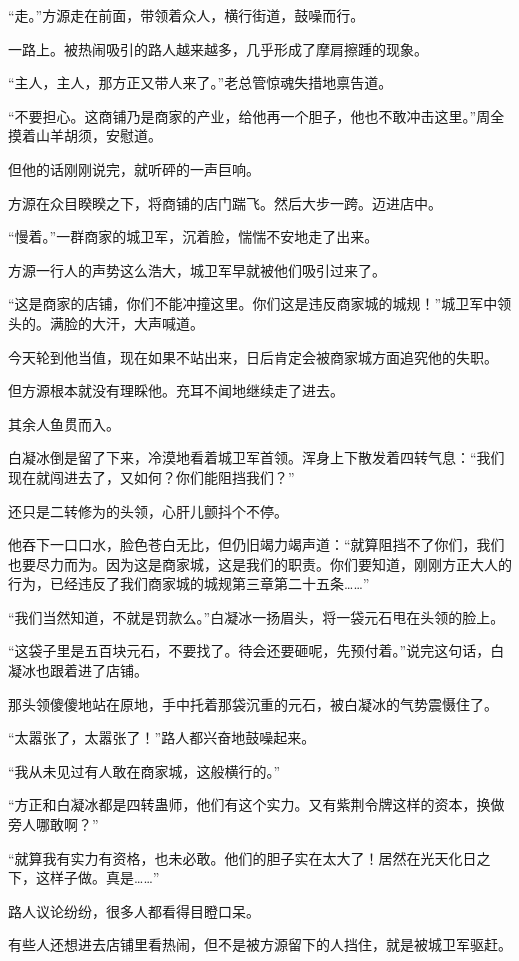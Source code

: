 \begin{this_body}
“走。”方源走在前面，带领着众人，横行街道，鼓噪而行。

一路上。被热闹吸引的路人越来越多，几乎形成了摩肩擦踵的现象。

“主人，主人，那方正又带人来了。”老总管惊魂失措地禀告道。

“不要担心。这商铺乃是商家的产业，给他再一个胆子，他也不敢冲击这里。”周全摸着山羊胡须，安慰道。

但他的话刚刚说完，就听砰的一声巨响。

方源在众目睽睽之下，将商铺的店门踹飞。然后大步一跨。迈进店中。

“慢着。”一群商家的城卫军，沉着脸，惴惴不安地走了出来。

方源一行人的声势这么浩大，城卫军早就被他们吸引过来了。

“这是商家的店铺，你们不能冲撞这里。你们这是违反商家城的城规！”城卫军中领头的。满脸的大汗，大声喊道。

今天轮到他当值，现在如果不站出来，日后肯定会被商家城方面追究他的失职。

但方源根本就没有理睬他。充耳不闻地继续走了进去。

其余人鱼贯而入。

白凝冰倒是留了下来，冷漠地看着城卫军首领。浑身上下散发着四转气息：“我们现在就闯进去了，又如何？你们能阻挡我们？”

还只是二转修为的头领，心肝儿颤抖个不停。

他吞下一口口水，脸色苍白无比，但仍旧竭力竭声道：“就算阻挡不了你们，我们也要尽力而为。因为这是商家城，这是我们的职责。你们要知道，刚刚方正大人的行为，已经违反了我们商家城的城规第三章第二十五条……”

“我们当然知道，不就是罚款么。”白凝冰一扬眉头，将一袋元石甩在头领的脸上。

“这袋子里是五百块元石，不要找了。待会还要砸呢，先预付着。”说完这句话，白凝冰也跟着进了店铺。

那头领傻傻地站在原地，手中托着那袋沉重的元石，被白凝冰的气势震慑住了。

“太嚣张了，太嚣张了！”路人都兴奋地鼓噪起来。

“我从未见过有人敢在商家城，这般横行的。”

“方正和白凝冰都是四转蛊师，他们有这个实力。又有紫荆令牌这样的资本，换做旁人哪敢啊？”

“就算我有实力有资格，也未必敢。他们的胆子实在太大了！居然在光天化日之下，这样子做。真是……”

路人议论纷纷，很多人都看得目瞪口呆。

有些人还想进去店铺里看热闹，但不是被方源留下的人挡住，就是被城卫军驱赶。


\end{this_body}
